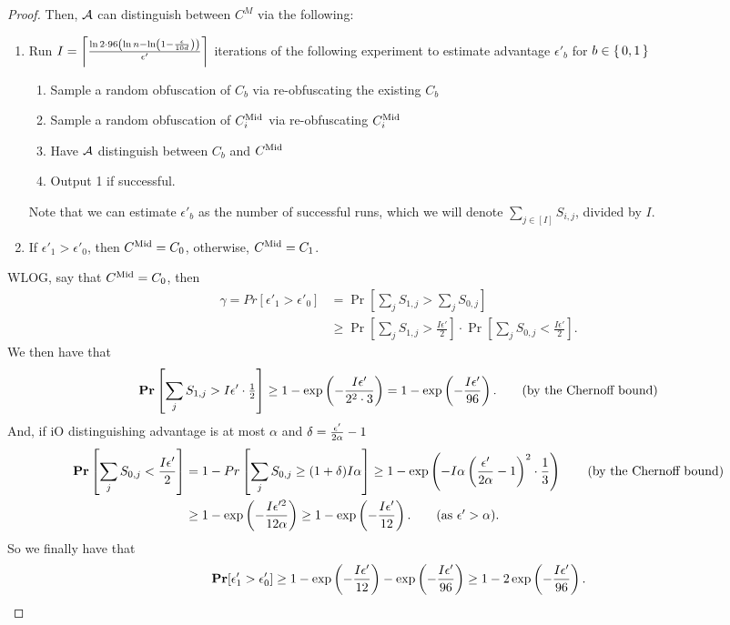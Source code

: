 \begin{lemma}
\begin{proof}
		Then, $\mathcal{A}$ can distinguish between $C^M$ via the following:
		\begin{enumerate}
			\item Run $I =\left\lceil \frac{\ln2 \cdot 96\left(\ln n - \ln \left(1 - \frac{\epsilon}{10d}\right)\right)}{\epsilon'} \right\rceil$ iterations of the following experiment to estimate advantage $\epsilon'_b$ for $b \in \set{0, 1}$
				\begin{enumerate}
					\item Sample a random obfuscation of $C_b$ via re-obfuscating the existing $C_b$
					\item Sample a random obfuscation of $C^{\text{Mid}}_i$ via re-obfuscating $C^{\text{Mid}}_i$
					\item Have $\mathcal{A}$ distinguish between $C_b$ and $C^{\text{Mid}}$
					\item Output 1 if successful.
				\end{enumerate}
			Note that we can estimate $\epsilon'_b$ as the number of successful runs, which we will denote $\sum_{j \in [I]} S_{i, j}$, divided by $I$.
			\item If $\epsilon'_1 > \epsilon'_0$, then $C^{\text{Mid}} = C_0$, otherwise, $C^{\text{Mid}} = C_1$.
		\end{enumerate}
		WLOG, say that $C^{\text{Mid}} = C_0$, then
		\begin{align*}
			\gamma = Pr[\epsilon'_1 > \epsilon'_0] &= \Pr[\sum_{j} S_{1, j} > \sum_{j} S_{0, j}]\\
			&\geq \Pr\left[\sum_{j} S_{1, j} > \frac{I\epsilon'}{2}\right] \cdot \Pr\left[\sum_{j} S_{0, j} < \frac{I\epsilon'}{2}\right].
		\end{align*}
		We then have that
		\begin{align*}
			\operatorname*{\mathbf{Pr}}\left[\sum_{j} S_{1, j} > I\epsilon' \cdot \tfrac{1}{2}\right] \geq 1 - \exp\left( -\frac{I\epsilon'}{2^2 \cdot 3}\right) =  1 - \exp\left( -\frac{I\epsilon'}{96}\right). \tag{by the Chernoff bound}
		\end{align*}
		And, if iO distinguishing advantage is at most $\alpha$ and $\delta = \frac{\epsilon'}{2\alpha} - 1$
		\begin{align*}
			\Pr\left[\sum_{j} S_{0, j} < \frac{I\epsilon'}{2}\right] &= 1 - Pr\left[\sum_{j} S_{0, j} \geq  (1 + \delta) I\alpha\right]
			\geq 1 - \exp\left( - I \alpha \left(\frac{\eps'}{2\alpha} - 1\right)^2 \cdot \frac{1}{3} \right) \tag{by the Chernoff bound}\\
			&\geq 1 - \exp\left( - \frac{I\eps'^2}{12\alpha}\right) \geq 1 - \exp\left(-\frac{I\eps'}{12}\right). \tag{as $\eps' > \alpha$}.
		\end{align*}
		So we finally have that
		\begin{equation}
			\operatorname*{\mathbf{Pr}}[\epsilon'_1 > \epsilon'_0] \geq 1 - \exp\left(-\frac{I\epsilon'}{12}\right) - \exp\left( -\frac{I\epsilon'}{96}\right) \geq 1 - 2\exp\left( -\frac{I\epsilon'}{96}\right). 
		\end{equation}
		

\end{proof}
\end{lemma}
